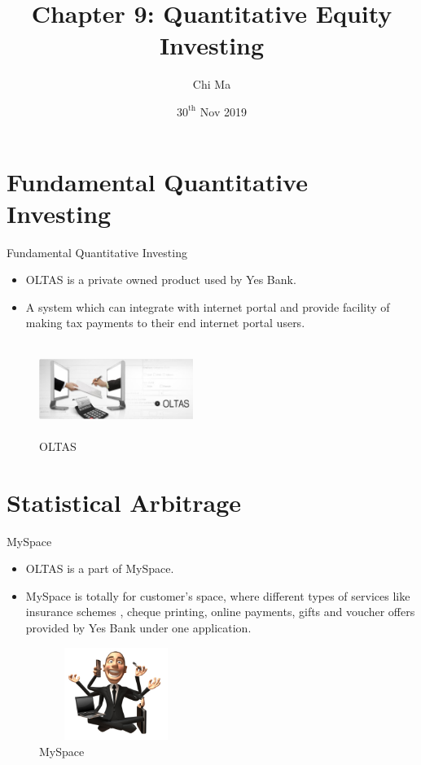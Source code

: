\documentclass{beamer}
\title[Efficiently Inefficient]{Chapter 9: Quantitative Equity Investing}
\author{Chi Ma\\}
\institute{\bf Qishi Buyside StudyGroup}
\date{$30^{\text{th}}$ Nov 2019}
\begin{document}
\begin{frame}
  \titlepage
\end{frame}
\tableofcontents

\section{Fundamental Quantitative Investing}

\begin{frame}{Fundamental Quantitative Investing}

\begin{itemize}
  \item OLTAS is a private owned product used by Yes Bank.
  \item A system which can integrate with internet portal and provide facility of making tax payments to their end internet portal users.
\end{itemize}

\begin{figure}
\includegraphics[width=5cm ,height= 3cm]{oltas-header.jpg}
\caption{\label{fig:your-figure}OLTAS}
\end{figure}
\vskip 1cm

\end{frame}


\section{Statistical Arbitrage}

\begin{frame}{MySpace}

\begin{itemize}
  \item OLTAS is a part of MySpace.
  \item MySpace is totally for customer’s space, where different types of services like insurance schemes , cheque printing, online payments, gifts and voucher offers provided by Yes Bank under one application.

\end{itemize}

\begin{figure}
\includegraphics[width=5cm ,height= 3cm]{multitasking_cartoon.jpg}
\caption{\label{fig:your-figure}MySpace}
\end{figure}
\vskip 1cm

\end{frame}
\end{document}
